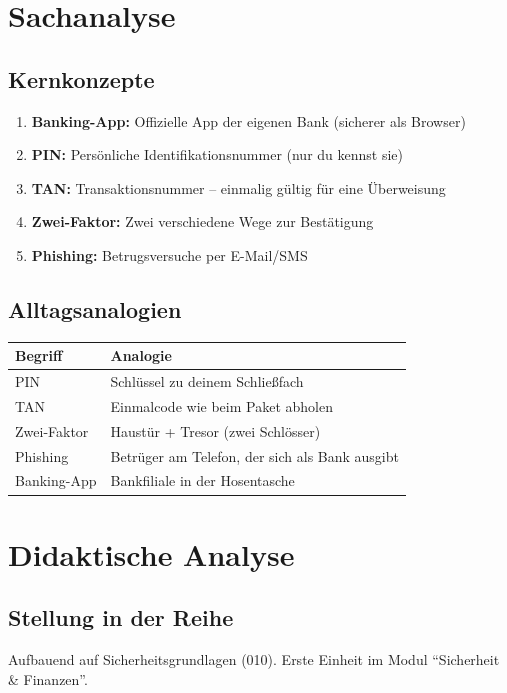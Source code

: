 \documentclass[11pt,a4paper]{article}
\begin{document}
\section{Sachanalyse}

\subsection{Kernkonzepte}
\begin{enumerate}
    \item \textbf{Banking-App:} Offizielle App der eigenen Bank (sicherer als Browser)
    \item \textbf{PIN:} Persönliche Identifikationsnummer (nur du kennst sie)
    \item \textbf{TAN:} Transaktionsnummer -- einmalig gültig für eine Überweisung
    \item \textbf{Zwei-Faktor:} Zwei verschiedene Wege zur Bestätigung
    \item \textbf{Phishing:} Betrugsversuche per E-Mail/SMS
\end{enumerate}

\subsection{Alltagsanalogien}
\begin{tabular}{|l|p{8cm}|}
\hline
\textbf{Begriff} & \textbf{Analogie} \\
\hline
PIN & Schlüssel zu deinem Schließfach \\
TAN & Einmalcode wie beim Paket abholen \\
Zwei-Faktor & Haustür + Tresor (zwei Schlösser) \\
Phishing & Betrüger am Telefon, der sich als Bank ausgibt \\
Banking-App & Bankfiliale in der Hosentasche \\
\hline
\end{tabular}

\section{Didaktische Analyse}

\subsection{Stellung in der Reihe}
Aufbauend auf Sicherheitsgrundlagen (010). Erste Einheit im Modul ``Sicherheit \& Finanzen''.
\end{document}
